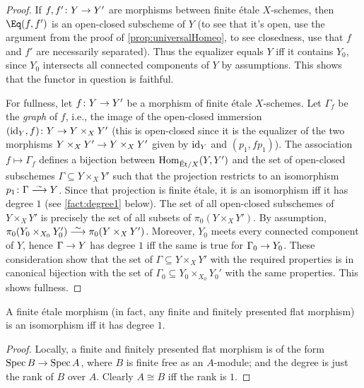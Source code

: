 \begin{proof}
	If $f,f'\colon Y\morphism Y'$ are morphisms between finite étale $X$-schemes, then $\Eq(f,f')$ is an open-closed subscheme of $Y$ (to see that it's open, use the argument from the proof of \cref{prop:universalHomeo}, to see closedness, use that $f$ and $f'$ are necessarily separated). Thus the equalizer equals $Y$ iff it contains $Y_0$, since $Y_0$ intersects all  connected components of $Y$ by assumptions. This shows that the functor in question is faithful.
	
	For fullness, let $f\colon Y\morphism Y'$ be a morphism of finite étale $X$-schemes. Let $\Gamma_f$ be the \emph{graph} of $f$, i.e., the image of the open-closed immersion $(\id_Y,f)\colon Y\morphism Y\times_XY'$ (this is open-closed since it is the equalizer of the two morphisms $Y\times_XY'\morphism Y\times_XY'$ given by $\operatorname{id}_Y$ and $(p_1,fp_1)$). The association $f\mapsto \Gamma_f$ defines a bijection between $\operatorname{Hom}_{\mathrm{\acute{E}t}/X}(Y,Y')$ and the set of open-closed subschemes $\Gamma\subseteq Y\times_XY'$ such that the projection restricts to an isomorphism $p_1\colon \Gamma\isomorphism Y$. Since that projection is finite étale, it is an isomorphism iff it has degree $1$ (see \cref{fact:degree1} below). The set of all open-closed subschemes of $Y\times_XY'$ is precisely the set of all subsets of $\pi_0(Y\times_XY')$. By assumption, $\pi_0(Y_0\times_{X_0}Y'_0)\isomorphism \pi_0(Y\times_XY')$. Moreover, $Y_0$ meets every connected component of $Y$, hence $\Gamma\morphism Y$ has degree $1$ iff the same is true for $\Gamma_0\morphism Y_0$. These consideration show that the set of $\Gamma\subseteq Y\times_XY'$ with the required properties is in canonical bijection with the set of $\Gamma_0\subseteq Y_0\times_{X_0}Y_0'$ with the same properties. This shows fullness.
\end{proof}
\begin{fact}\label{fact:degree1}
	A finite étale morphism (in fact, any finite and finitely presented flat morphism) is an isomorphism iff it has degree $1$.
\end{fact}
\begin{proof}
	Locally, a finite and finitely presented flat morphism is of the form $\Spec B\morphism \Spec A$, where $B$ is finite free as an $A$-module; and the degree is just the rank of $B$ over $A$. Clearly $A\cong B$ iff the rank is $1$.
\end{proof}
